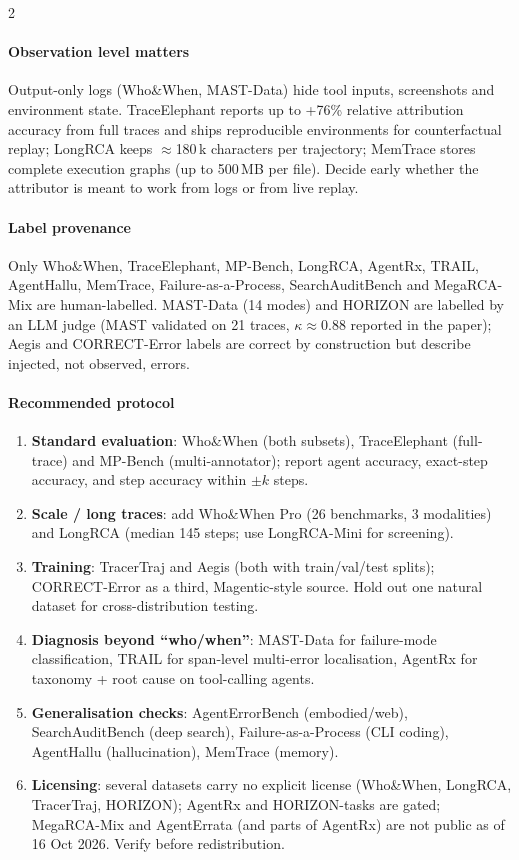 \begin{multicols}{2}
\paragraph{Observation level matters} Output-only logs (Who\&When, MAST-Data) hide tool inputs, screenshots and environment state. TraceElephant reports up to +76\% relative attribution accuracy from full traces and ships reproducible environments for counterfactual replay; LongRCA keeps $\approx$180\,k characters per trajectory; MemTrace stores complete execution graphs (up to 500\,MB per file). Decide early whether the attributor is meant to work from logs or from live replay.

\paragraph{Label provenance} Only Who\&When, TraceElephant, MP-Bench, LongRCA, AgentRx, TRAIL, AgentHallu, MemTrace, Failure-as-a-Process, SearchAuditBench and MegaRCA-Mix are human-labelled. MAST-Data (14 modes) and HORIZON are labelled by an LLM judge (MAST validated on 21 traces, $\kappa\approx0.88$ reported in the paper); Aegis and CORRECT-Error labels are correct by construction but describe injected, not observed, errors.

\paragraph{Recommended protocol}
\begin{enumerate}[leftmargin=1.2em]
\item \textbf{Standard evaluation}: Who\&When (both subsets), TraceElephant (full-trace) and MP-Bench (multi-annotator); report agent accuracy, exact-step accuracy, and step accuracy within $\pm k$ steps.
\item \textbf{Scale / long traces}: add Who\&When Pro (26 benchmarks, 3 modalities) and LongRCA (median 145 steps; use LongRCA-Mini for screening).
\item \textbf{Training}: TracerTraj and Aegis (both with train/val/test splits); CORRECT-Error as a third, Magentic-style source. Hold out one natural dataset for cross-distribution testing.
\item \textbf{Diagnosis beyond ``who/when''}: MAST-Data for failure-mode classification, TRAIL for span-level multi-error localisation, AgentRx for taxonomy + root cause on tool-calling agents.
\item \textbf{Generalisation checks}: AgentErrorBench (embodied/web), SearchAuditBench (deep search), Failure-as-a-Process (CLI coding), AgentHallu (hallucination), MemTrace (memory).
\item \textbf{Licensing}: several datasets carry no explicit license (Who\&When, LongRCA, TracerTraj, HORIZON); AgentRx and HORIZON-tasks are gated; MegaRCA-Mix and AgentErrata (and parts of AgentRx) are not public as of 16 Oct 2026. Verify before redistribution.
\end{enumerate}
\end{multicols}
